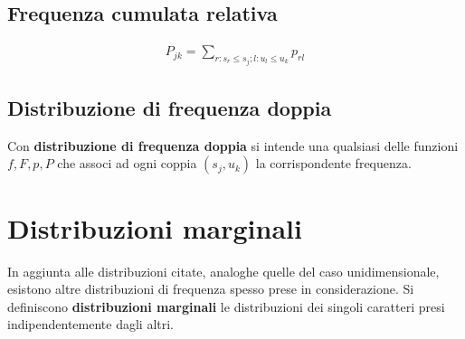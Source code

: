 \subsection{Frequenza cumulata relativa}
\begin{align}
P_{jk} = \sum_{r: s_r \leq s_j; l: u_l \leq u_k} p_{rl}
\end{align}

\subsection{Distribuzione di frequenza doppia}
Con \textbf{distribuzione di frequenza doppia} si intende una qualsiasi delle funzioni $f, F, p, P$ che associ ad ogni coppia $(s_j, u_k)$ la corrispondente frequenza. \newline


\section{Distribuzioni marginali}
In aggiunta alle distribuzioni citate, analoghe quelle del caso unidimensionale, esistono altre distribuzioni di frequenza spesso prese in considerazione.
Si definiscono \textbf{distribuzioni marginali} le distribuzioni dei singoli caratteri presi indipendentemente dagli altri.


